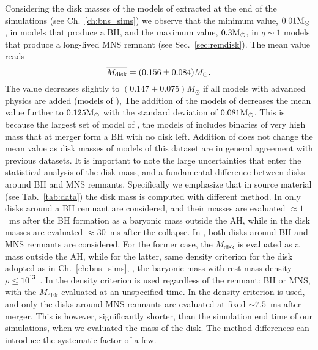 Considering the disk masses of the models of \DSrefset{} extracted at the end of 
the simulations (see Ch.~\ref{ch:bns_sims}) we observe that the minimum value, 
$0.01{\text{M}_{\odot}}$, in models that produce a \ac{BH}, and the maximum value, $0.3{\text{M}_{\odot}}$, 
in $q\sim1$ models that produce a long-lived \ac{MNS} remnant 
(see Sec.~\ref{sec:remdisk}).
The mean value reads 
%
\begin{equation}
\overline{M_{\rm disk}} = (0.156 \pm 0.084) M_{\odot}.
\end{equation}
%
The value decreases slightly to $(0.147 \pm 0.075)M_{\odot}$ if all models with 
advanced physics are added (models of \DSheatcool{}), 
The addition of the models of \DScool{} decreases the mean value further to $0.125{\text{M}_{\odot}}$ 
with the standard deviation of $0.081{\text{M}_{\odot}}$. This is because the largest set of model of 
\DScool{}, the models of \citet{Radice:2018pdn} includes binaries of very high mass that 
at merger form a \ac{BH} with no disk left. Addition of \DSnone{} does not change the mean 
value as disk masses of models of this dataset are in general agreement with previous 
datasets.
%
It is important to note the large uncertainties that enter the statistical analysis of the 
disk mass, and a fundamental difference between disks around \ac{BH} and \ac{MNS} remnants.
Specifically we emphasize that in source material (see Tab.~\ref{tab:data}) the disk mass is 
computed with different method. 
%
In \citet{Dietrich:2015iva,Dietrich:2016hky} only disks around a \ac{BH} remnant are considered, 
and their masses are evaluated ${\approx}1$~ms after the \ac{BH} formation as a baryonic mass 
outside the \ac{AH}, while in \citet{Sekiguchi:2016bjd} the disk masses are evaluated 
${\approx}30$~ms after the collapse.
%
In \citet{Radice:2018pdn}, both disks around \ac{BH} and \ac{MNS} remnants are considered. 
For the former case, the $M_{\text{disk}}$ is evaluated as a mass outside the \ac{AH}, while for
the latter, same density criterion for the disk adopted as in Ch.~\ref{ch:bns_sims}, \ie, the 
baryonic mass with rest mass density $\rho\leq10^{13}$~\gcm.
%
In \citet{Kiuchi:2019lls} the density criterion is used regardless of the remnant: 
\ac{BH} or \ac{MNS}, with the $M_{\text{disk}}$ evaluated at an unspecified time.
%
In \citet{Vincent:2019kor} the density criterion is used, and only the disks around 
\ac{MNS} remnants are evaluated at fixed ${\sim}7.5$~ms after merger. This is however,
significantly shorter, than the simulation end time of our simulations, when we evaluated 
the mass of the disk. 
%
The method differences can introduce the systematic factor of a few.


